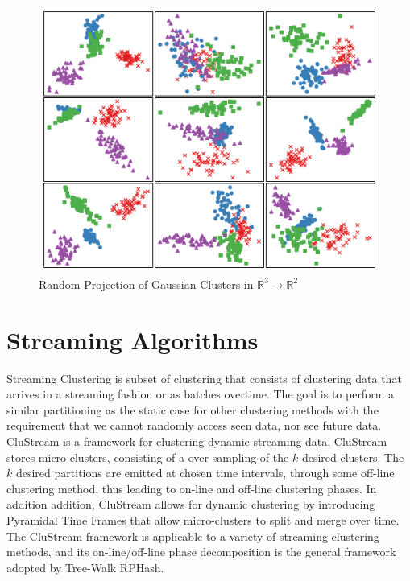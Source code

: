 \begin{figure}
    \centerline{\includegraphics[width=.70\textwidth]{figs/3dto2dproj}}
    \caption{Random Projection of Gaussian Clusters in $\mathbb{R}^3\rightarrow \mathbb{R}^2$}
    \label{3dto2d}
\end{figure}

\section{Streaming Algorithms}

Streaming Clustering is subset of clustering that consists of clustering data that arrives in a streaming fashion or as
batches overtime.  The goal is to perform a similar partitioning as the static case for other clustering methods with
the requirement that we cannot randomly access seen data, nor see future data.  CluStream \cite{clustream} is a
framework for clustering dynamic streaming data.  CluStream stores micro-clusters, consisting of a over sampling of the
$k$ desired clusters.  The $k$ desired partitions are emitted at chosen time intervals, through some off-line clustering
method, thus leading to on-line and off-line clustering phases.  In addition addition, CluStream allows for dynamic
clustering by introducing Pyramidal Time Frames that allow micro-clusters to split and merge over time.  The CluStream
framework is applicable to a variety of streaming clustering methods, and its on-line/off-line phase decomposition is
the general framework adopted by Tree-Walk \textsf{RPHash}.

